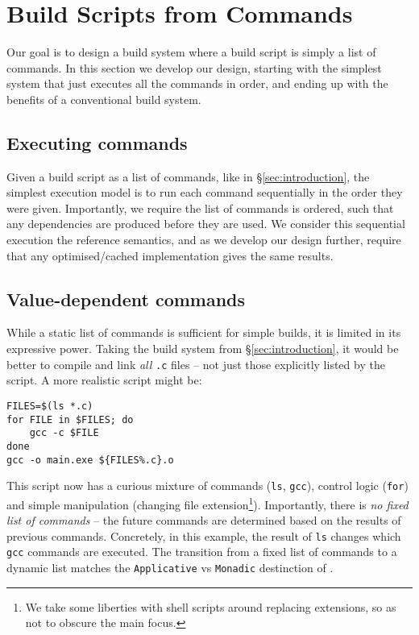 \section{Build Scripts from Commands}
\label{sec:design}

Our goal is to design a build system where a build script is simply a list of commands. In this section we develop our design, starting with the simplest system that just executes all the commands in order, and ending up with the benefits of a conventional build system.

\subsection{Executing commands}
\label{sec:executing_commands}

Given a build script as a list of commands, like in \S\ref{sec:introduction}, the simplest execution model is to run each command sequentially in the order they were given. Importantly, we require the list of commands is ordered, such that any dependencies are produced before they are used. We consider this sequential execution the reference semantics, and as we develop our design further, require that any optimised/cached implementation gives the same results.

\subsection{Value-dependent commands}
\label{sec:monadic}

While a static list of commands is sufficient for simple builds, it is limited in its expressive power. Taking the build system from \S\ref{sec:introduction}, it would be better to compile and link \emph{all} \texttt{.c} files -- not just those explicitly listed by the script. A more realistic script might be:

\vspace{3mm}
\begin{verbatim}
FILES=$(ls *.c)
for FILE in $FILES; do
    gcc -c $FILE
done
gcc -o main.exe ${FILES%.c}.o
\end{verbatim}
\vspace{3mm}

This script now has a curious mixture of commands (\texttt{ls}, \texttt{gcc}), control logic (\texttt{for}) and simple manipulation (changing file extension\footnote{We take some liberties with shell scripts around replacing extensions, so as not to obscure the main focus.}). Importantly, there is \emph{no fixed list of commands} -- the future commands are determined based on the results of previous commands. Concretely, in this example, the result of \texttt{ls} changes which \texttt{gcc} commands are executed. The transition from a fixed list of commands to a dynamic list matches the \texttt{Applicative} vs \texttt{Monadic} destinction of \citet[\S3.5]{build_systems_a_la_carte}.

